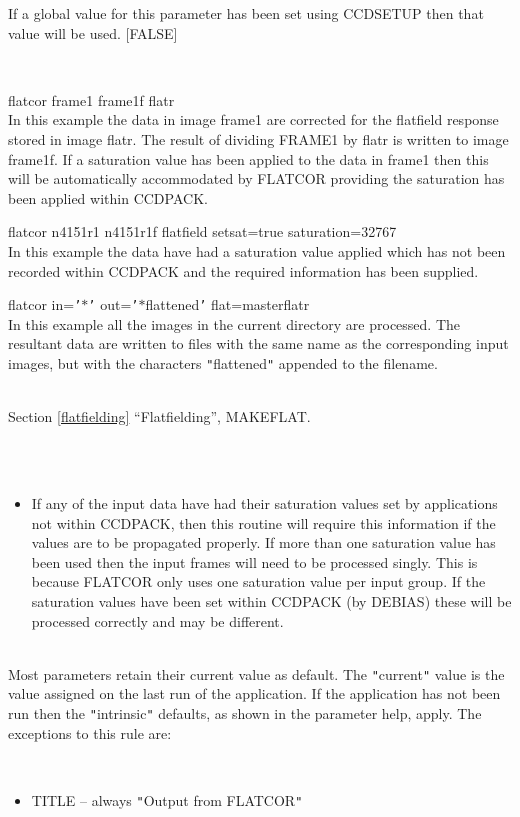 \documentclass[twoside,11pt]{article}
\newcommand{\htmlref}[2]{#1}
\newcommand{\latexhtml}[2]{#1}
\renewcommand{\_}{\texttt{\symbol{95}}}
\newcommand{\qt}[1]{{\tt "}#1{\tt "}}
\newcommand{\qs}[1]{{\tt '}#1{\tt '}}
\newcommand{\routine}[1]{{\sc #1}}
\newcommand{\xroutine}[1]{\htmlref{{\sc #1}}{#1}}
\newcommand{\secref}[2]{\latexhtml{Section \ref{#1} ``#2''}{``\htmlref{#2}{#1}''}}
\newcommand{\sstexamples}[1]{
   \item[Examples:] \mbox{} \\
   \vspace{-3.5ex}
   \begin{description}
      #1
   \end{description}
}
\newcommand{\sstexamplesubsection}[2]{\sloppy \item{\ssttt #1} \mbox{} \\ #2 }
\newcommand{\sstnotes}[1]{\item[Notes:] \mbox{} \\[1.3ex] #1}
\newcommand{\sstdiytopic}[2]{\item[#1:] \mbox{} \\[1.3ex] #2}
\newcommand{\sstitemlist}[1]{
  \mbox{} \\
  \vspace{-3.5ex}
  \begin{itemize}
     #1
  \end{itemize}
}
\newcommand{\sstitem}{\item}
\newcommand{\sstexamples}[1]{
      \item[Examples:] \\
      \begin{description}
         #1
      \end{description}
      \\
   }
\newcommand{\sstexamplesubsection}[2]{\item[{\ssttt #1}] #2}
\newcommand{\sstnotes}[1]{\item[Notes:] #1 }
\newcommand{\sstdiytopic}[2]{\item[{#1:}] #2 }
\newcommand{\sstitemlist}[1]{
      \begin{itemize}
         #1
      \end{itemize}
      \\
   }
\newcommand{\sstitem}{\item}
\begin{document}
{{{         If a global value for this parameter has been set using 
         CCDSETUP then that value will be used. 
         [FALSE]
      }
   }
   \sstexamples{
      \sstexamplesubsection{
         flatcor frame1 frame1\_f flatr
      } {
         In this example the data in image frame1 are corrected for the
         flatfield response stored in image flatr. The result of dividing
         FRAME1 by flatr is written to image frame1\_f. If a saturation
         value has been applied to the data in frame1 then this will be
         automatically accommodated by \routine{FLATCOR} providing the saturation
         has been applied within CCDPACK.
      }
      \sstexamplesubsection{
         flatcor n4151r1 n4151r1f flatfield setsat=true saturation=32767
      } {
         In this example the data have had a saturation value applied
         which has not been recorded within CCDPACK and the required
         information has been supplied.
      }
      \sstexamplesubsection{
         flatcor in=\qs{$*$} out=\qs{$*$\_flattened} flat=master\_flatr
      } {
         In this example all the images in the current directory are
         processed. The resultant data are written to files with the
         same name as the corresponding input images, but with the
         characters \qt{\_flattened} appended to the filename.
      }
   }
   \sstdiytopic{
      See also
   } {
      \secref{flatfielding}{Flatfielding}, 
      \xroutine{MAKEFLAT}.
   }
   \sstnotes{
      \sstitemlist{

         \sstitem
         If any of the input data have had their saturation values set by
           applications not within CCDPACK, then this routine will require
           this information if the values are to be propagated properly. If
           more than one saturation value has been used then the input
           frames will need to be processed singly. This is because \routine{FLATCOR}
           only uses one saturation value per input group. If the
           saturation values have been set within CCDPACK (by \xroutine{DEBIAS})
           these will be processed correctly and may be different.
      }
   }
   \sstdiytopic{
      Behaviour of parameters
   } {
      Most parameters retain their current value as default. The
      \qt{current} value is the value assigned on the last run of the
      application. If the application has not been run then the
      \qt{intrinsic} defaults, as shown in the parameter help, apply.
      The exceptions to this rule are:
      \sstitemlist{

         \sstitem
            TITLE   -- always \qt{Output from FLATCOR}

}}}
\end{document}
